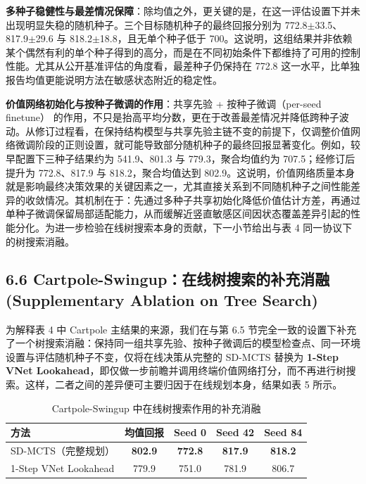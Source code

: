 \documentclass[UTF8]{ctexart}
\begin{document}
\textbf{多种子稳健性与最差情况保障}：除均值之外，更关键的是，在这一评估设置下并未出现明显失稳的随机种子。三个目标随机种子的最终回报分别为
772.8$\pm$33.5、817.9$\pm$29.6 与 818.2$\pm$18.8，且无单个种子低于
700。这说明，这组结果并非依赖某个偶然有利的单个种子得到的高分，而是在不同初始条件下都维持了可用的控制性能。尤其从公开基准评估的角度看，最差种子仍保持在 772.8
这一水平，比单独报告均值更能说明方法在敏感状态附近的稳定性。

\textbf{价值网络初始化与按种子微调的作用}：共享先验 + 按种子微调（per-seed finetune）
的作用，不只是抬高平均分数，更在于改善最差情况并降低跨种子波动。从修订过程看，在保持结构模型与共享先验主链不变的前提下，仅调整价值网络微调阶段的正则设置，就可能导致部分随机种子的最终回报显著变化。例如，较早配置下三种子结果约为 541.9、801.3 与 779.3，聚合均值约为 707.5；经修订后提升为 772.8、817.9 与 818.2，聚合均值达到 802.9。这说明，价值网络质量本身就是影响最终决策效果的关键因素之一，尤其直接关系到不同随机种子之间性能差异的收敛情况。其机制在于：先通过多种子共享初始化降低价值估计方差，再通过单种子微调保留局部适配能力，从而缓解近竖直敏感区间因状态覆盖差异引起的性能分化。为进一步检验在线树搜索本身的贡献，下一小节给出与表
4 同一协议下的树搜索消融。

\hypertarget{ux5bf9ux6a21ux578bux7684ux6d88ux878dux5206ux6790-ablation-study}{%
\subsection{6.6 Cartpole-Swingup：在线树搜索的补充消融 (Supplementary Ablation on Tree Search)}\label{ux5bf9ux6a21ux578bux7684ux6d88ux878dux5206ux6790-ablation-study}}

为解释表 4 中 Cartpole 主结果的来源，我们在与第 6.5 节完全一致的设置下补充了一个树搜索消融：保持同一组共享先验、按种子微调后的模型检查点、同一环境设置与评估随机种子不变，仅将在线决策从完整的
SD-MCTS 替换为 \textbf{1-Step VNet Lookahead}，即仅做一步前瞻并调用终端价值网络打分，而不再进行树搜索。这样，二者之间的差异便可主要归因于在线规划本身，结果如表 5 所示。

\begin{table}[ht]
\centering
\caption{Cartpole-Swingup 中在线树搜索作用的补充消融}
\begin{tabular}{l c c c c}
\toprule
方法 & 均值回报 & Seed 0 & Seed 42 & Seed 84 \\
\midrule
SD-MCTS（完整规划） & \textbf{802.9} & \textbf{772.8} & \textbf{817.9} & \textbf{818.2} \\
1-Step VNet Lookahead & 779.9 & 751.0 & 781.9 & 806.7 \\
\bottomrule
\end{tabular}
\end{table}
\end{document}

